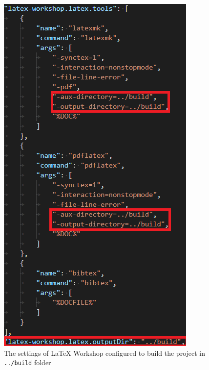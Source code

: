 \documentclass{article}
\newcommand{\latex}{\LaTeX\xspace}
\begin{document}
\begin{figure}
	\includegraphics[scale=0.6,center]{../resources/build_fix_settings.png}
	\caption{The settings of \latex Workshop configured to build the project in \texttt{../build} folder}
	\label{fig:build_fix_settings}
\end{figure}
\end{document}
